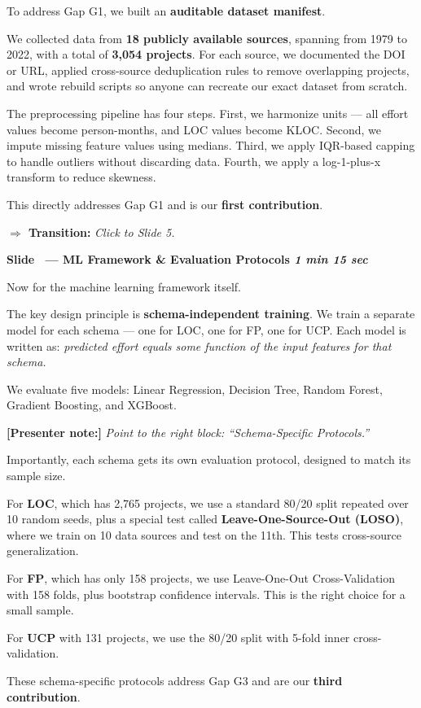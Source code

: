 \documentclass[12pt,a4paper]{article}
\newcounter{slidenum}
\newcommand{\slide}[2]{%
  \stepcounter{slidenum}%
  \vspace{0.6em}
  \begin{mdframed}[backgroundcolor=slideblue!90, linecolor=slideblue,
    leftmargin=0pt, rightmargin=0pt, innerleftmargin=10pt,
    innerrightmargin=10pt, innertopmargin=6pt, innerbottommargin=6pt]
    \color{white}\large\bfseries Slide \theslidenum\ --- #1
    \hfill \textcolor{yellow!80!white}{\normalsize\itshape #2}
  \end{mdframed}
  \vspace{0.3em}
}
\newcommand{\say}[1]{%
  \begin{mdframed}[backgroundcolor=bglight, linecolor=slideblue!40,
    leftmargin=0pt, rightmargin=0pt, innerleftmargin=12pt,
    innerrightmargin=12pt, innertopmargin=8pt, innerbottommargin=8pt,
    linewidth=1.5pt]
  #1
  \end{mdframed}
}
\newcommand{\pointnote}[1]{%
  \vspace{0.2em}
  \noindent\textcolor{noteorange}{\bfseries [Presenter note:]} \textit{#1}
  \vspace{0.2em}
}
\newcommand{\transition}[1]{%
  \vspace{0.15em}
  \noindent\textcolor{timergreen}{\bfseries $\Rightarrow$ Transition:} \textit{#1}
  \vspace{0.3em}
}
\begin{document}
\say{
To address Gap G1, we built an \textbf{auditable dataset manifest}.

We collected data from \textbf{18 publicly available sources}, spanning from 1979 to 2022, with a total of \textbf{3,054 projects}. For each source, we documented the DOI or URL, applied cross-source deduplication rules to remove overlapping projects, and wrote rebuild scripts so anyone can recreate our exact dataset from scratch.

The preprocessing pipeline has four steps. First, we harmonize units --- all effort values become person-months, and LOC values become KLOC. Second, we impute missing feature values using medians. Third, we apply IQR-based capping to handle outliers without discarding data. Fourth, we apply a log-1-plus-x transform to reduce skewness.

This directly addresses Gap G1 and is our \textbf{first contribution}.
}

\transition{Click to Slide 5.}

\slide{ML Framework \& Evaluation Protocols}{1 min 15 sec}

\say{
Now for the machine learning framework itself.

The key design principle is \textbf{schema-independent training}. We train a separate model for each schema --- one for LOC, one for FP, one for UCP. Each model is written as: \textit{predicted effort equals some function of the input features for that schema.}

We evaluate five models: Linear Regression, Decision Tree, Random Forest, Gradient Boosting, and XGBoost.
}

\pointnote{Point to the right block: ``Schema-Specific Protocols.''}

\say{
Importantly, each schema gets its own evaluation protocol, designed to match its sample size.

For \textbf{LOC}, which has 2,765 projects, we use a standard 80/20 split repeated over 10 random seeds, plus a special test called \textbf{Leave-One-Source-Out (LOSO)}, where we train on 10 data sources and test on the 11th. This tests cross-source generalization.

For \textbf{FP}, which has only 158 projects, we use Leave-One-Out Cross-Validation with 158 folds, plus bootstrap confidence intervals. This is the right choice for a small sample.

For \textbf{UCP} with 131 projects, we use the 80/20 split with 5-fold inner cross-validation.

These schema-specific protocols address Gap G3 and are our \textbf{third contribution}.
}
\end{document}
